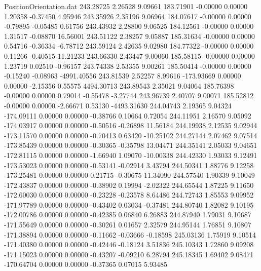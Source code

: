 \begin{filecontents}{PositionOrientation.dat}
 243.28725    2.26528    9.09661   183.71901   -0.00000    0.00000    1.20358   -0.37450    4.95946
 243.35926    2.35196    9.06964   184.07617   -0.00000    0.00000   -0.79895   -0.05485    0.61756
 243.43932    2.28800    9.06525   184.12561   -0.00000    0.00000    1.31517   -0.08870   16.56001
 243.51122    2.38257    9.05887   185.31634   -0.00000    0.00000    0.54716   -0.36334   -6.78712
 243.59124    2.42635    9.02980   184.77322   -0.00000    0.00000    0.11266   -0.40515   11.21233
 243.66330    2.43447    9.00060   185.58115   -0.00000    0.00000    1.23719    0.02510   -0.96157
 243.74338    2.53355    9.00261   185.50414   -0.00000    0.00000   -0.15240   -0.08963 -4991.40556
 243.81539    2.52257    8.99616  -173.93669    0.00000    0.00000   -2.15356    0.55575 4494.30713
 243.89543    2.35021    9.04064   185.76398   -0.00000    0.00000    0.79014   -0.55478   -3.27744
 243.96739    2.40707    9.00071   185.52812   -0.00000    0.00000   -2.66671    0.53130 -4493.31630
 244.04743    2.19365    9.04324  -174.09111    0.00000    0.00000   -0.38766    0.10664    0.72054
 244.11951    2.16570    9.05092  -174.03917    0.00000    0.00000   -0.50516   -0.26898   11.56184
 244.19938    2.12535    9.02944  -173.11570    0.00000    0.00000   -0.70413    0.63420  -10.25102
 244.27144    2.07462    9.07514  -173.85439    0.00000    0.00000   -0.30365   -0.35798   13.04471
 244.35141    2.05033    9.04651  -172.81115    0.00000    0.00000   -1.66940    1.09070  -10.00338
 244.42330    1.93033    9.12491  -173.53023    0.00000    0.00000   -0.53141   -0.02914    3.43794
 244.50341    1.88776    9.12258  -173.25481    0.00000    0.00000    0.21715   -0.30675   11.34090
 244.57540    1.90339    9.10049  -172.43837    0.00000    0.00000   -0.38902    0.19994   -2.02322
 244.65544    1.87225    9.11650  -172.60030    0.00000    0.00000   -0.23228   -0.23578    8.64486
 244.72743    1.85553    9.09952  -171.97789    0.00000    0.00000   -0.43402    0.03034   -0.37481
 244.80740    1.82082    9.10195  -172.00786    0.00000    0.00000   -0.42385    0.06840    6.26883
 244.87940    1.79031    9.10687  -171.55649    0.00000    0.00000   -0.30261    0.01657    2.32579
 244.95144    1.76851    9.10807  -171.38894    0.00000    0.00000   -0.11662   -0.03666   -0.18598
 245.03136    1.75919    9.10514  -171.40380    0.00000    0.00000   -0.42446   -0.18124    3.51836
 245.10343    1.72860    9.09208  -171.15023    0.00000    0.00000   -0.43207   -0.09210    6.28794
 245.18345    1.69402    9.08471  -170.64704    0.00000    0.00000   -0.37365    0.07015    5.93485

\end{filecontents}
